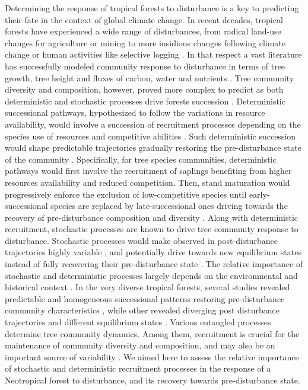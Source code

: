 \documentclass[fleqn,10pt]{ArtEcoFoG} %
\begin{document}
Determining the response of tropical forests to disturbance is a key to predicting their fate in the context of global climate change. In recent decades, tropical forests have experienced a wide range of disturbances, from radical land-use changes for agriculture or mining \citep{Dezecache2017a, Dezecache2017b} to more insidious changes following climate change or human activities like selective logging \citep{Baraloto2012a, Aubry-Kientz2015}.
In that respect a vast literature has successfully modeled community response to disturbance in terms of tree growth, tree height and fluxes of carbon, water and nutrients \citep{Gourlet-Fleury2000, Putz2012, Piponiot2016, Rutishauser2016}.
Tree community diversity and composition, however, proved more complex to predict as both deterministic and stochastic processes drive forests succession \citep{Norden2015}.
Deterministic successional pathways, hypothesized to follow the variations in resource availability, would involve a succession of recruitment processes depending on the species use of resources and competitive abilities \citep{Clements1916, Meiners2015}.
Such deterministic succession would shape predictable trajectories gradually restoring the pre-disturbance state of the community \citep{Chesson2000, Rees2001, Adler2007}.
Specifically, for tree species communities, deterministic pathways would first involve the recruitment of saplings benefiting from higher resources availability and reduced competition. Then, stand maturation would progressively enforce the exclusion of low-competitive species until early-successional species are replaced by late-successional ones driving towards the recovery of pre-disturbance composition and diversity \citep{Denslow2000}.
Along with deterministic recruitment, stochastic processes are known to drive tree community response to disturbance.
Stochastic processes would make observed in post-disturbance trajectories highly variable \citep{Brokaw2000, Norden2015}, and potentially drive towards new equilibrium states instead of fully recovering their pre-disturbance state \citep{Hubbell2001, Chave2004, Norden2015}.
The relative importance of stochastic and deterministic processes largely depends on the environmental and historical context \citep{Chazdon2008, Norden2015}.
In the very diverse tropical forests, several studies revealed predictable and homogeneous successional patterns restoring pre-disturbance community characteristics \citep{Norden2009, Letcher2015}, while other revealed diverging post disturbance trajectories and different equilibrium states \citep{Longworth2014}.
Various entangled processes determine tree community dynamics. Among them, recruitment is crucial for the maintenance of community diversity and composition, and may also be an important source of variability \citep{Grubb1977, Hurtt1995, Clark1998}.
We aimed here to assess the relative importance of stochastic and deterministic recruitment processes in the response of a Neotropical forest to disturbance, and its recovery towards pre-disturbance state.
\end{document}
